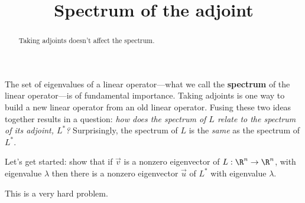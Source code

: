 \documentclass{ximera}
\title{Spectrum of the adjoint}
\begin{document}
\begin{abstract}
  Taking adjoints doesn't affect the spectrum.
\end{abstract}\maketitle

The set of eigenvalues of a linear operator---what we call the
\textbf{spectrum} of the linear operator---is of fundamental
importance.  Taking adjoints is one way to build a new linear operator
from an old linear operator.  Fusing these two ideas together results
in a question: \textit{how does the spectrum of $L$ relate to the
  spectrum of its adjoint, $L^*$?}  Surprisingly, the spectrum of $L$
is the \textit{same} as the spectrum of $L^*$.
	
Let's get started: show that if $\vec{v}$ is a nonzero eigenvector of
$L:\R^n \to \R^n$, with eigenvalue $\lambda$ then there is a nonzero
eigenvector $\vec{u}$ of $L^*$ with eigenvalue $\lambda$.

\begin{warning}
  This is a very hard problem.
\end{warning}
\end{document}

